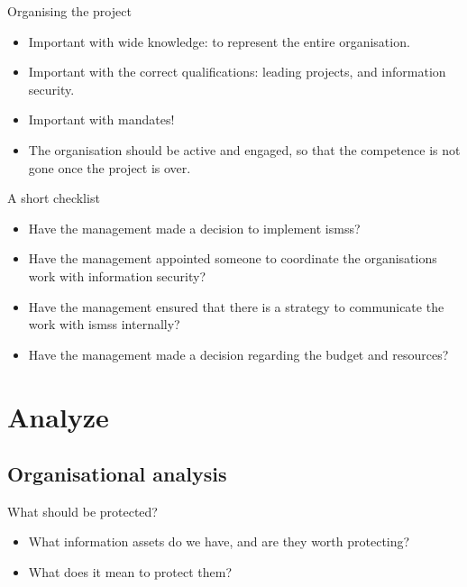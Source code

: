 \documentclass{beamer}
\begin{document}
\begin{frame}{Organising the project}
  \begin{itemize}
    \item Important with wide knowledge: to represent the entire organisation.
    \item Important with the correct qualifications: leading projects, and
      information security.
    \item Important with mandates!
    \item The organisation should be active and engaged, so that the competence
      is not gone once the project is over.
  \end{itemize}
\end{frame}

\begin{frame}{A short checklist}
  \begin{itemize}
    \item Have the management made a decision to implement \acp{isms}?
    \item Have the management appointed someone to coordinate the organisations
      work with information security?
    \item Have the management ensured that there is a strategy to communicate
      the work with \acp{isms} internally?
    \item Have the management made a decision regarding the budget and
      resources?
  \end{itemize}
\end{frame}

\section{Analyze}

\subsection{Organisational analysis}

\begin{frame}{What should be protected?}
  \begin{itemize}
    \item What information assets do we have, and are they worth protecting?
    \item What does it mean to protect them?
  \end{itemize}
\end{frame}
\end{document}
